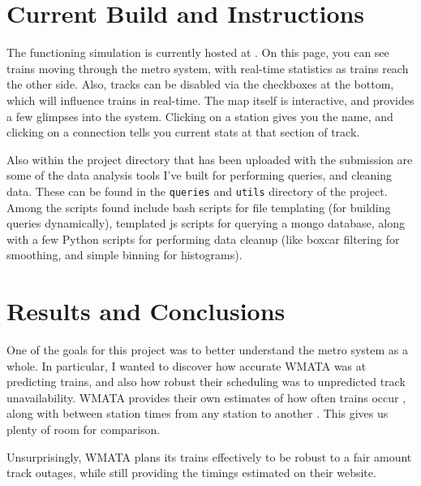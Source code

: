 \documentclass[a4paper,12pt]{article}
\begin{document}
\section{Current Build and Instructions}
The functioning simulation is currently hosted at \cite{aprilandchip}. On this page, you can see trains moving through
the metro system, with real-time statistics as trains reach the other side. Also, tracks can be disabled via the
checkboxes at the bottom, which will influence trains in real-time. The map itself is interactive, and provides a few
glimpses into the system. Clicking on a station gives you the name, and clicking on a connection tells you current stats
at that section of track.

Also within the project directory that has been uploaded with the submission are some of the data analysis tools I've
built for performing queries, and cleaning data. These can be found in the \texttt{queries} and \texttt{utils}
directory of the project. Among the scripts found include bash scripts for file templating (for building queries
dynamically), templated js scripts for querying a mongo database, along with a few Python scripts for performing data
cleanup (like boxcar filtering for smoothing, and simple binning for histograms).

\section{Results and Conclusions}
One of the goals for this project was to better understand the metro system as a whole. In particular, I wanted to
discover how accurate WMATA was at predicting trains, and also how robust their scheduling was to unpredicted track
unavailability. WMATA provides their own estimates of how often trains occur \cite{metroschedule}, along with between
station times from any station to another \cite{rosslyntime}. This gives us plenty of room for comparison.


Unsurprisingly, WMATA plans its trains effectively to be robust to a fair amount track outages, while still providing
the timings estimated on their website. 



\end{document}
